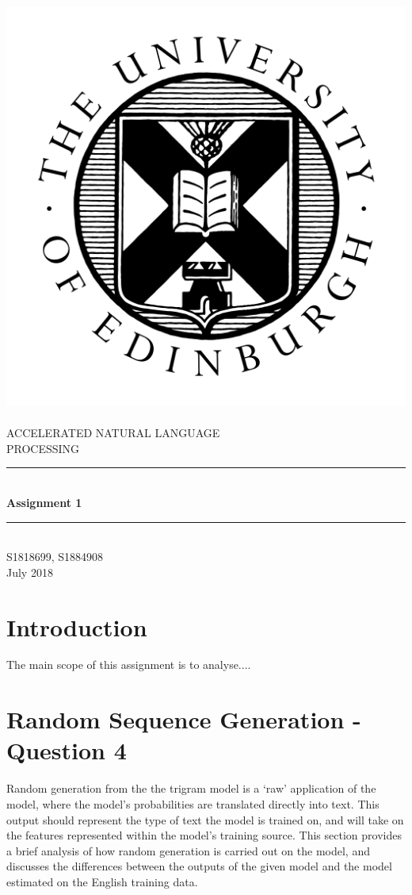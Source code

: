 \documentclass[12pt]{article}
\begin{document}
	
	
\begin{titlepage}
	\newcommand{\HRule}{\rule{\linewidth}{0.5mm}} %
	\center %
	\includegraphics[width = 0.3 \linewidth]{"./graphics/avatar-roundel-blackonwhite"}\\[0.5cm]
	\textsc{\\[1cm]\LARGE ACCELERATED NATURAL LANGUAGE \\
             \hfill\break PROCESSING}\\[2cm]

	\HRule \\[0.4cm]
	{ \huge \bfseries Assignment 1}\\[0.1cm]
	\HRule \\[1.5cm]
	\Large
	\vfill
	 S1818699, S1884908\\[0.5cm]
	{\large July 2018}
\end{titlepage}
\setlength\parindent{0pt}		
\newpage
\doublespacing
\tableofcontents
\singlespacing
\newpage
	
\section{Introduction}

The main scope of this assignment is to analyse....

\section{Random Sequence Generation - Question 4}
Random generation from the the trigram model is a `raw' application of the model, where the model's probabilities are translated directly into text.  This output should represent the type of text the model is trained on, and will  take on the features represented within the model's training source.  This section provides a brief analysis of how random generation is carried out on the model, and discusses the differences between the outputs of the given model and the model estimated on the English training data.
\end{document}
